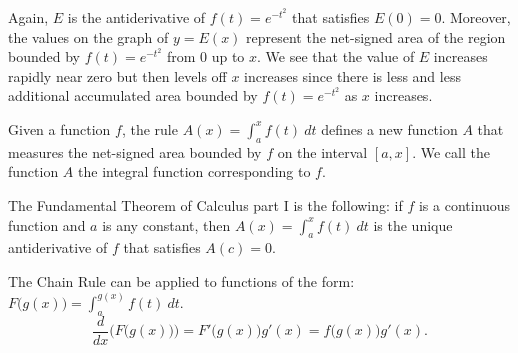 Again, $E$ is the antiderivative of $f(t) = e^{-t^2}$ that satisfies $E(0) = 0$.  Moreover, the values on the graph of $y = E(x)$ represent the net-signed area of the region bounded by $f(t) = e^{-t^2}$ from $0$ up to $x$.  We see that the value of $E$ increases rapidly near zero but then levels off $x$ increases since there is less and less additional accumulated area bounded by $f(t) = e^{-t^2}$ as $x$ increases.



\begin{summary} 
\item Given a function $f$, the rule $A(x) = \int_a^x f(t) \ dt$ defines a new function $A$ that measures the net-signed area bounded by $f$ on the interval $[a,x]$.  We call the function $A$ the integral function corresponding to $f$.

\item The Fundamental Theorem of Calculus part I is the following:  if $f$ is a continuous function and $a$ is any constant, then $A(x) = \int_a^x f(t) \ dt$ is the unique antiderivative of $f$ that satisfies $A(c) = 0$.

\item The Chain Rule can be applied to functions of the form: $F\big( g(x) \big) = \int_a^{g(x)} f(t) \ dt$.   
\[ \frac{d}{dx} \Big( F \big( g(x) \big) \Big) = F' \big( g(x) \big) g'(x) = f \big( g(x) \big) g'(x).\]
\end{summary}

\clearpage

 

\cleardoublepage
